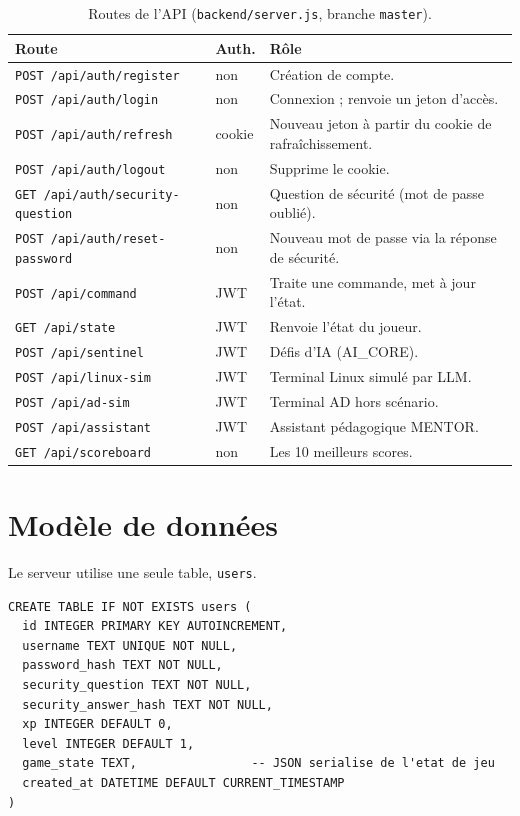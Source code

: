 \documentclass[11pt,a4paper]{report}
\newcommand{\file}[1]{\texttt{\nolinkurl{#1}}}
\begin{document}
\begin{table}[H]
\centering
\small
\begin{tabularx}{\textwidth}{@{}llX@{}}
\toprule
\textbf{Route} & \textbf{Auth.} & \textbf{R\^ole} \\
\midrule
\texttt{POST /api/auth/register}        & non & Cr\'eation de compte. \\
\texttt{POST /api/auth/login}           & non & Connexion ; renvoie un jeton d'acc\`es. \\
\texttt{POST /api/auth/refresh}         & cookie & Nouveau jeton \`a partir du cookie de rafra\^ichissement. \\
\texttt{POST /api/auth/logout}          & non & Supprime le cookie. \\
\texttt{GET  /api/auth/security-question} & non & Question de s\'ecurit\'e (mot de passe oubli\'e). \\
\texttt{POST /api/auth/reset-password}  & non & Nouveau mot de passe via la r\'eponse de s\'ecurit\'e. \\
\texttt{POST /api/command}              & JWT & Traite une commande, met \`a jour l'\'etat. \\
\texttt{GET  /api/state}                & JWT & Renvoie l'\'etat du joueur. \\
\texttt{POST /api/sentinel}             & JWT & D\'efis d'IA (AI\_CORE). \\
\texttt{POST /api/linux-sim}            & JWT & Terminal Linux simul\'e par LLM. \\
\texttt{POST /api/ad-sim}               & JWT & Terminal AD hors sc\'enario. \\
\texttt{POST /api/assistant}            & JWT & Assistant p\'edagogique MENTOR. \\
\texttt{GET  /api/scoreboard}           & non & Les 10 meilleurs scores. \\
\bottomrule
\end{tabularx}
\caption{Routes de l'API (\file{backend/server.js}, branche \texttt{master}).}
\end{table}

\section{Mod\`ele de donn\'ees}

Le serveur utilise une seule table, \texttt{users}.

\begin{lstlisting}[style=plain,caption={Table \texttt{users} (\file{backend/database/db.js})}]
CREATE TABLE IF NOT EXISTS users (
  id INTEGER PRIMARY KEY AUTOINCREMENT,
  username TEXT UNIQUE NOT NULL,
  password_hash TEXT NOT NULL,
  security_question TEXT NOT NULL,
  security_answer_hash TEXT NOT NULL,
  xp INTEGER DEFAULT 0,
  level INTEGER DEFAULT 1,
  game_state TEXT,                -- JSON serialise de l'etat de jeu
  created_at DATETIME DEFAULT CURRENT_TIMESTAMP
)
\end{lstlisting}
\end{document}
